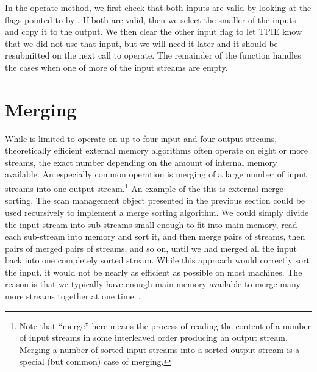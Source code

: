 In the operate method, we first check that both inputs are valid by
looking at the flags pointed to by .  If both are valid,
then we select the smaller of the inputs and copy it to the output.
We then clear the other input flag to let TPIE know that we did not
use that input, but we will need it later and it should be resubmitted
on the next call to operate. The remainder of the function handles
the cases when one of more of the input streams are empty.


\section{Merging} 

While  is limited to operate on up to
four input and four output streams, theoretically efficient
external memory algorithms often operate on eight or more
streams, the exact number depending on the amount of
internal memory available. An especially common operation is
merging of a large number of input streams into one output
stream.\footnote{Note that ``merge'' here means the process
   of reading the content of a number of input streams in
   some interleaved order producing an output stream.
   Merging a number of sorted input streams into a sorted
   output stream is a special (but common) case of
   merging.} An example of the this is external merge
sorting. The  scan management
object presented in the previous section could be used
recursively to implement a merge sorting algorithm. We could simply divide the
input stream into sub-streams small enough to fit into main
memory, read each sub-stream into memory and sort it, and
then merge pairs of streams, then pairs of merged pairs of
streams, and so on, until we had merged all the input back
into one completely sorted stream. While this approach would
correctly sort the input, it would not be nearly as
efficient as possible on most machines. The reason is that
we typically have enough main memory available to merge many
more streams together at one time~\cite{aggarwal:input}.

